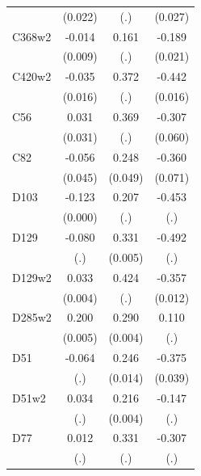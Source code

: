 \begin{table}[htbp]
\begin{tabular}{l*{3}{c}}
                &  (0.022)         &      (.)         &  (0.027)         \\
C368w2          &   -0.014         &    0.161         &   -0.189\sym{***}\\
                &  (0.009)         &      (.)         &  (0.021)         \\
C420w2          &   -0.035\sym{**} &    0.372         &   -0.442\sym{***}\\
                &  (0.016)         &      (.)         &  (0.016)         \\
C56             &    0.031         &    0.369         &   -0.307\sym{***}\\
                &  (0.031)         &      (.)         &  (0.060)         \\
C82             &   -0.056         &    0.248\sym{***}&   -0.360\sym{***}\\
                &  (0.045)         &  (0.049)         &  (0.071)         \\
D103            &   -0.123\sym{***}&    0.207         &   -0.453         \\
                &  (0.000)         &      (.)         &      (.)         \\
D129            &   -0.080         &    0.331\sym{***}&   -0.492         \\
                &      (.)         &  (0.005)         &      (.)         \\
D129w2          &    0.033\sym{***}&    0.424         &   -0.357\sym{***}\\
                &  (0.004)         &      (.)         &  (0.012)         \\
D285w2          &    0.200\sym{***}&    0.290\sym{***}&    0.110         \\
                &  (0.005)         &  (0.004)         &      (.)         \\
D51             &   -0.064         &    0.246\sym{***}&   -0.375\sym{***}\\
                &      (.)         &  (0.014)         &  (0.039)         \\
D51w2           &    0.034         &    0.216\sym{***}&   -0.147         \\
                &      (.)         &  (0.004)         &      (.)         \\
D77             &    0.012         &    0.331         &   -0.307         \\
                &      (.)         &      (.)         &      (.)         \\

\end{tabular}
\end{table}
